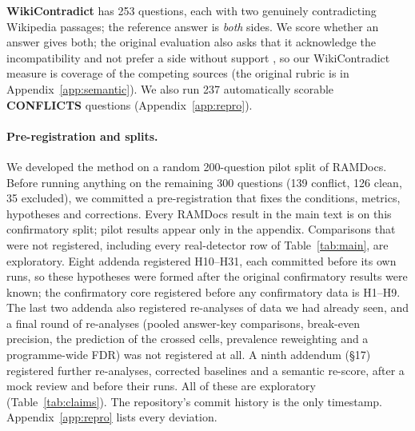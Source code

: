\textbf{WikiContradict} \citep{hou2024wikicontradict} has 253 questions, each with two genuinely contradicting
Wikipedia passages; the reference answer is \emph{both} sides. We score whether an answer gives both; the original evaluation also asks that it acknowledge the incompatibility and not prefer a side without support \citep[\S3.4]{hou2024wikicontradict}, so our WikiContradict measure is coverage of the competing sources (the original rubric is in Appendix~\ref{app:semantic}). We also run 237 automatically scorable
\textbf{CONFLICTS} \citep{cattan2025conflicts} questions (Appendix~\ref{app:repro}).

\paragraph{Pre-registration and splits.}
We developed the method on a random 200-question pilot split of RAMDocs. Before running anything on the remaining 300
questions (139 conflict, 126 clean, 35 excluded), we committed a pre-registration that fixes the conditions, metrics,
hypotheses and corrections. Every RAMDocs result in the main text is on this confirmatory split; pilot results appear
only in the appendix. Comparisons that were not registered, including every real-detector row of
Table~\ref{tab:main}, are exploratory. Eight addenda registered H10--H31, each committed before its own runs, so
these hypotheses were formed after the original confirmatory results were known; the confirmatory core registered
before any confirmatory data is H1--H9. The last two addenda also registered re-analyses of data we had already seen, and a final
round of re-analyses (pooled answer-key comparisons, break-even precision, the prediction of the crossed cells,
prevalence reweighting and a programme-wide FDR) was not registered at all. A ninth addendum (\S17) registered further re-analyses, corrected baselines and a semantic re-score, after a mock review and before their runs. All of these are exploratory
(Table~\ref{tab:claims}). The repository's commit history is the only timestamp. Appendix~\ref{app:repro} lists every deviation.

